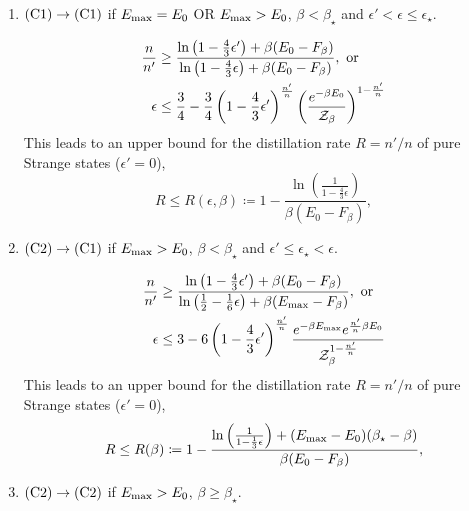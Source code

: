 \documentclass[pra,
aps,
twocolumn,
superscriptaddress,
groupedaddress,
nofootinbib,
reprint
]{revtex4-1}
\begin{document}
\begin{enumerate}
	\item $\rm{(C1)} \rightarrow \rm{(C1)}$ if $E_{\rm{max}} = E_0$ OR $E_{\rm{max}} > E_0$, $\beta < \beta_{\star}$ and $\epsilon' < \epsilon  \leq \epsilon_{\star}$.
	
\begin{align}
	\frac{n}{n'} &\geq \frac{\ln{\big( 1-\frac{4}{3}\epsilon' \big)} + \beta (E_0 - F_\beta)}{\ln{\big( 1-\frac{4}{3}\epsilon \big)} + \beta (E_0 - F_\beta)}, \text{ or} \\
	\epsilon &\leq \frac{3}{4} - \frac{3}{4} \left( 1 - \frac{4}{3}\epsilon' \right)^{\frac{n'}{n}} \left( \frac{e^{-\beta E_0}}{\mathcal{Z}_\beta} \right)^{1 - \frac{n'}{n}}	
\end{align}
This leads to an upper bound for the distillation rate $R=n'/n$ of pure Strange states ($\epsilon' = 0$),
\begin{equation}
	R \leq R(\epsilon, \beta) \coloneqq 1 - \frac{\ln{\left( \frac{1}{1 - \frac{4}{3}\epsilon} \right)}}{\beta (E_0 - F_\beta)},
\end{equation}
	
	\item $\rm{(C2)} \rightarrow \rm{(C1)}$ if $E_{\rm{max}} > E_0$, $\beta < \beta_{\star}$ and $\epsilon' \leq \epsilon_{\star} < \epsilon$.
	
\begin{align}
	\frac{n}{n'} &\geq \frac{\ln{\big( 1-\frac{4}{3}\epsilon' \big)} + \beta (E_0 - F_\beta)}{\ln{\big( \frac{1}{2}-\frac{1}{6}\epsilon \big)} + \beta (E_{\rm{max}} - F_\beta)}, \text{ or} \\
	\epsilon &\leq 3 - 6 \left( 1 - \frac{4}{3}\epsilon' \right)^{\frac{n'}{n}} \frac{e^{-\beta E_{\rm{max}}} e^{\frac{n'}{n}\beta E_0}}{\mathcal{Z}_\beta^{1-\frac{n'}{n}}}	
\end{align}
This leads to an upper bound for the distillation rate $R=n'/n$ of pure Strange states ($\epsilon' = 0$),
\begin{equation}
	R \leq R(\beta) \coloneqq 1 - \frac{\ln{\left(\frac{1}{1-\frac{1}{3}\epsilon} \right)} + (E_{\rm{max}} - E_0)(\beta_{\star} - \beta)}{\beta (E_0 - F_\beta)},
\end{equation}

	\item $\rm{(C2)} \rightarrow \rm{(C2)}$ if $E_{\rm{max}} > E_0$, $\beta \geq \beta_{\star}$.
	

\end{enumerate}
\end{document}
